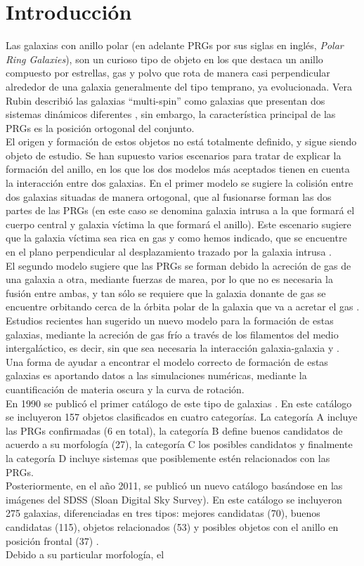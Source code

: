 \documentclass{article}
\begin{document}
\section{Introducción}
Las galaxias con anillo polar (en adelante PRGs por sus siglas en inglés, \emph{Polar Ring Galaxies}), son un curioso tipo de objeto en los que destaca un anillo compuesto por estrellas, gas y polvo que rota de manera casi perpendicular alrededor de una galaxia generalmente del tipo temprano, ya evolucionada. Vera Rubin describió las galaxias ``multi-spin'' como galaxias que presentan dos sistemas dinámicos diferentes \cite{Rubin1994d}, sin embargo, la característica principal de las PRGs es la posición ortogonal del conjunto.\\El origen y formación de estos objetos no está totalmente definido, y sigue siendo objeto de estudio. Se han supuesto varios escenarios para tratar de explicar la formación del anillo, en los que los dos modelos más aceptados tienen en cuenta la interacción entre dos galaxias. En el primer modelo se sugiere la colisión entre dos galaxias situadas de manera ortogonal, que al fusionarse forman las dos partes de las PRGs (en este caso se denomina galaxia intrusa a la que formará el cuerpo central y galaxia víctima la que formará el anillo). Este escenario sugiere que la galaxia víctima sea rica en gas y como hemos indicado, que se encuentre en el plano perpendicular al desplazamiento trazado por la galaxia intrusa \cite{Bournaud2003}.\\El segundo modelo sugiere que las PRGs se forman debido la acreción de gas de una galaxia a otra, mediante fuerzas de marea, por lo que no es necesaria la fusión entre ambas, y tan sólo se requiere que la galaxia donante de gas se encuentre orbitando cerca de la órbita polar de la galaxia que va a acretar el gas \cite{Bournaud2003}. Estudios recientes han sugerido un nuevo modelo para la formación de estas galaxias, mediante la acreción de gas frío a través de los filamentos del medio intergaláctico, es decir, sin que sea necesaria la interacción galaxia-galaxia \cite{Brook2008} y \cite{Iodice2014}. Una forma de ayudar a encontrar el modelo correcto de formación de estas galaxias es aportando datos a las simulaciones numéricas, mediante la cuantificación de materia oscura y la curva de rotación.\\En 1990 se publicó el primer catálogo de este tipo de galaxias \cite{Whitmore1990}. En este catálogo se incluyeron 157 objetos clasificados en cuatro categorías. La categoría A incluye las PRGs confirmadas (6 en total), la categoría B define buenos candidatos de acuerdo a su morfología (27), la categoría C los posibles candidatos y finalmente la categoría D incluye sistemas que posiblemente estén relacionados con las PRGs.\\Posteriormente, en el año 2011, se publicó un nuevo catálogo basándose en las imágenes del SDSS (Sloan Digital Sky Survey). En este catálogo se incluyeron 275 galaxias, diferenciadas en tres tipos: mejores candidatas (70), buenos candidatas (115), objetos relacionados (53) y posibles objetos con el anillo en posición frontal (37) \cite{Moiseev2011a}.\\Debido a su particular morfología, el 
\end{document}
